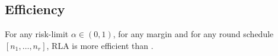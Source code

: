 % 





% 

\subsection{Efficiency}
\begin{lemma}
For any risk-limit $\alpha \in (0, 1)$, for any margin
and for any round schedule $[n_1, \ldots, n_r]$, 
 \Providence RLA is more efficient than \R \BRAVO.
\end{lemma}
